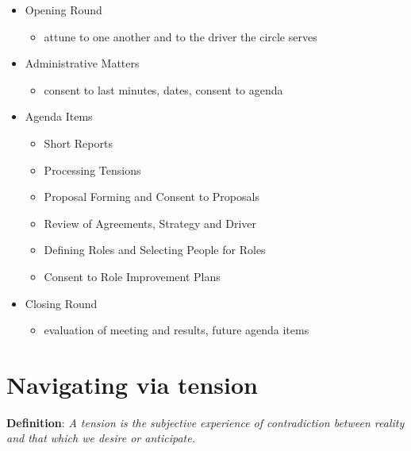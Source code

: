 \begin{itemize}
\item Opening Round

\begin{itemize}
\item attune to one another and to the driver the circle serves

\end{itemize}

\item Administrative Matters

\begin{itemize}
\item consent to last minutes, dates, consent to agenda

\end{itemize}

\item Agenda Items

\begin{itemize}
\item Short Reports

\item Processing Tensions

\item Proposal Forming and Consent to Proposals

\item Review of Agreements, Strategy and Driver

\item Defining Roles and Selecting People for Roles

\item Consent to Role Improvement Plans

\end{itemize}

\item Closing Round

\begin{itemize}
\item evaluation of meeting and results, future agenda items

\end{itemize}

\end{itemize}

\section{Navigating via tension}
\label{navigatingviatension}

\textbf{Definition}: \emph{A tension is the subjective experience of contradiction between reality and that which we desire or anticipate.}

